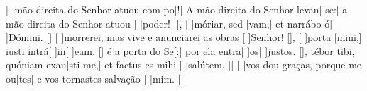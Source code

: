 {        {[ ]{mão} direita do Senhor atuou com po[!] A mão direita do Senhor levan[-se:] a mão direita do Senhor atuou [ ]{po}{der}! [\LinkPT]},
    {[ ]{mó}riar, sed [vam,] et narrábo ó[ ]{Dó}mini. [\LinkLA]}%
        {[ ]{mor}rerei, mas vive e anunciarei as obras [ ]{Se}{\-nhor}! [\LinkPT]},
    {[ ]{por}ta [mini,] iusti intrá[ ]{in}[ ]{e}am. [\LinkLA]}%
        { é a porta do Se[:] por ela entra[ ]{os}[ ]{jus}tos. [\LinkPT]},
    {tébor tibi, quóniam exau[sti me,] et factus es mihi [ ]{sa}{lú}tem. [\LinkLA]}%
        {[ ]{vos} dou graças, porque me ou[tes] e vos tornastes salvação [ ]{mim}. [\LinkPT]}
}